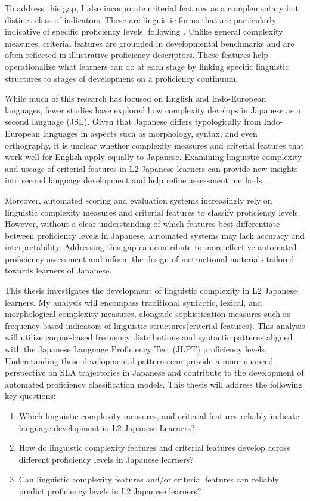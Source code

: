 To address this gap, I also incorporate criterial features as a complementary but distinct class of indicators.
These are
linguistic forms that are
particularly indicative of specific proficiency levels, following
\cite{Hawkins_Buttery_2010}. Unlike general complexity measures, criterial features are grounded in developmental
benchmarks and are often reflected in illustrative proficiency descriptors. These
features help operationalize what learners can do at each stage by linking
specific linguistic structures to stages of development on a proficiency continuum.

While much of this research has focused on English and Indo-European languages, fewer studies have explored how
complexity develops in Japanese as a second language (JSL). Given that Japanese differs typologically from
Indo-European languages in aspects such as morphology, syntax, and even orthography, it is unclear whether
complexity measures and criterial features that work well for English apply equally to Japanese. Examining linguistic
complexity and useage of criterial features in L2
Japanese learners can provide new insights into second language development and help refine assessment methods.

Moreover, automated scoring and evaluation systems increasingly rely on linguistic complexity measures and
criterial features to classify
proficiency levels. However, without a clear understanding of which features best differentiate between
proficiency levels in Japanese, automated systems may lack accuracy and interpretability. Addressing this gap can
contribute to more effective automated proficiency assessment and inform the design of instructional materials
tailored towards learners of Japanese.

This thesis investigates the development of linguistic complexity in L2 Japanese learners. My analysis will
encompass traditional syntactic, lexical, and morphological complexity measures, alongside sophistication measures
such as
frequency-based indicators of linguistic structures(criterial features). This analysis will utilize corpus-based
frequency distributions
and syntactic patterns aligned with the Japanese Language Proficiency Test (JLPT) proficiency levels.
Understanding these developmental patterns can provide a more nuanced
perspective on SLA trajectories in Japanese and contribute to the development of automated proficiency classification
models. This
thesis will address the following key questions:
\begin{enumerate}
    \item Which linguistic complexity measures, and criterial features reliably indicate language development in L2
    Japanese Learners?
    \item How do linguistic complexity features and criterial features develop across different
    proficiency
    levels in Japanese
    learners?
    \item Can linguistic complexity features and/or criterial features can reliably predict proficiency
    levels in L2 Japanese
    learners?
\end{enumerate}

